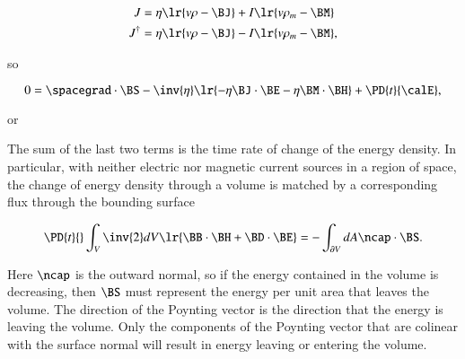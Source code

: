 \begin{dmath}\label{eqn:poyntingF:160}
\begin{aligned}
J &= \eta \lr{ v \rho - \BJ } + I \lr{ v \rho_m - \BM } \\
J^\dagger &= \eta \lr{ v \rho - \BJ } - I \lr{ v \rho_m - \BM },
\end{aligned}
\end{dmath}

so

\begin{dmath}\label{eqn:poyntingF:180}
0 =
\spacegrad \cdot \BS
-
\inv{\eta}
\lr{
- \eta \BJ \cdot \BE
- \eta \BM \cdot \BH
}
+ \PD{t}{\calE},
\end{dmath}

or

The sum of the last two terms is the time rate of change of the energy density.
In particular,
with neither electric nor magnetic current sources in a region of space,
the change of energy density through a volume is matched by a corresponding flux through the bounding surface

\begin{dmath}\label{eqn:maxwellsEquations:740}
\PD{t}{} \int_V
\inv{2} dV \lr{
\BB \cdot \BH
+ \BD \cdot \BE
}
=
-\int_{\partial V} dA \ncap \cdot \BS.
\end{dmath}

Here \( \ncap \) is the outward normal, so if the energy contained in the volume is decreasing, then \( \BS \) must represent the energy per unit area that leaves the volume.
The direction of the Poynting vector is the direction that the energy is leaving the volume.
Only the components of the Poynting vector that are colinear with the surface normal will result in energy leaving or entering the volume.

